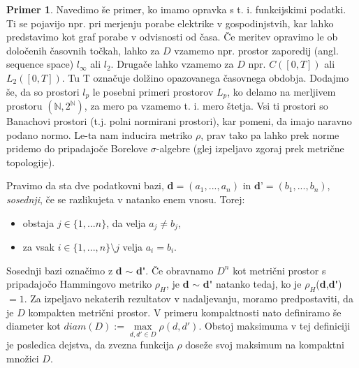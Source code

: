 \documentclass[12pt,a4paper]{amsart}
\theoremstyle{definition} %
\newtheorem{primer}[definicija]{Primer}
\theoremstyle{plain} %
\begin{document}
\begin{primer}
Navedimo še primer, ko imamo opravka s t. i. funkcijskimi podatki. Ti se pojavijo npr. pri merjenju porabe elektrike v gospodinjstvih, kar lahko predstavimo kot graf porabe v odvisnosti od časa. Če meritev opravimo le ob določenih časovnih točkah, lahko za $D$ vzamemo npr. prostor zaporedij (angl. sequence space) $l_{\infty}$ ali $l_{2}$. Drugače lahko vzamemo za $D$ npr. $C([0,T])$ ali $L_{2}([0,T])$. Tu T označuje dolžino opazovanega časovnega obdobja. Dodajmo še, da so prostori $l_p$ le posebni primeri prostorov $L_p$, ko delamo na merljivem prostoru $(\mathbb{N}, 2^\mathbb{N})$, za mero pa vzamemo t. i. mero štetja. Vsi ti prostori so Banachovi prostori (t.j. polni normirani prostori), kar pomeni, da imajo naravno podano normo. Le-ta nam inducira metriko $\rho$, prav tako pa lahko prek norme pridemo do pripadajoče Borelove $\sigma$-algebre (glej izpeljavo zgoraj prek metrične topologije). 
\end{primer}
\newline
\newline
Pravimo da sta dve podatkovni bazi, \textbf{d}$= (a_{1},...,a_{n})$ in $\textbf{d'}= (b_{1},...,b_{n})$,  \textit{sosednji}, če se razlikujeta v natanko enem vnosu. Torej:
\begin{itemize}
\item obstaja $j\in\{1,...n\}$, da velja $a_{j} \neq b_{j}$,
\item za vsak $i\in\{1,...,n\} \setminus j$ velja $a_{i} = b_{i}$.
\end{itemize}
Sosednji bazi označimo z \textbf{d} $\sim$ \textbf{d\'}. Če obravnamo $D^n$ kot metrični prostor s pripadajočo Hammingovo metriko $\rho_{H}$, je \textbf{d} $\sim$ \textbf{d\'} natanko tedaj, ko je $\rho_{H}$(\textbf{d},\textbf{d\'})$=1$.
\newline
\newline
Za izpeljavo nekaterih rezultatov v nadaljevanju, moramo predpostaviti, da je $D$ kompakten metrični prostor. V primeru kompaktnosti nato definiramo še diameter kot $diam(D) := \max\limits_{d,d' \in D}\rho(d,d')$. Obstoj maksimuma v tej definiciji je posledica dejstva, da zvezna funkcija $\rho$ doseže svoj maksimum na kompaktni množici $D$.
\end{document}
